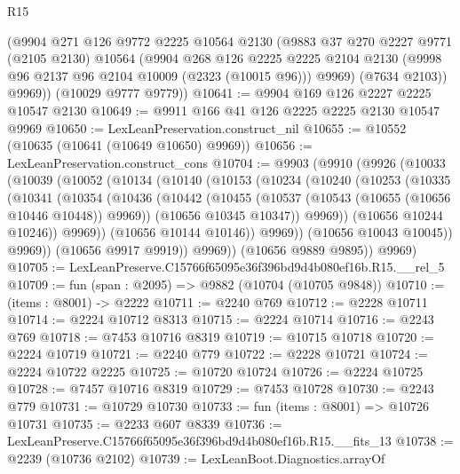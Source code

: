 \begin{lexlean}{R15}
\begin{coremodule}
        (@9904
          @271
          @126
          @9772
          @2225
          @10564
          @2130
          (@9883
            @37
            @270
            @2227
            @9771
            (@2105 @2130)
            @10564
            (@9904
              @268
              @126
              @2225
              @2225
              @2104
              @2130
              (@9998 @96 @2137 @96 @2104 @10009 (@2323 (@10015 @96)))
              @9969)
            (@7634 @2103))
          @9969))
      (@10029 @9777 @9779))
@10641 := @9904 @169 @126 @2227 @2225 @10547 @2130
@10649 := @9911 @166 @41 @126 @2225 @2225 @2130 @10547 @9969
@10650 := LexLeanPreservation.construct_nil
@10655 := @10552 (@10635 (@10641 (@10649 @10650) @9969))
@10656 := LexLeanPreservation.construct_cons
@10704 := @9903
    (@9910
      (@9926
        (@10033
          (@10039
            (@10052
              (@10134
                (@10140
                  (@10153
                    (@10234
                      (@10240
                        (@10253
                          (@10335
                            (@10341
                              (@10354
                                (@10436
                                  (@10442
                                    (@10455
                                      (@10537 (@10543 (@10655 (@10656 @10446 @10448)) @9969))
                                      (@10656 @10345 @10347))
                                    @9969))
                                (@10656 @10244 @10246))
                              @9969))
                          (@10656 @10144 @10146))
                        @9969))
                    (@10656 @10043 @10045))
                  @9969))
              (@10656 @9917 @9919))
            @9969))
        (@10656 @9889 @9895))
      @9969)
@10705 := LexLeanPreserve.C15766f65095e36f396bd9d4b080ef16b.R15.__rel_5
@10709 := fun (span : @2095) => @9882 (@10704 (@10705 @9848))
@10710 := (items : @8001) -> @2222
@10711 := @2240 @769
@10712 := @2228 @10711
@10714 := @2224 @10712 @8313
@10715 := @2224 @10714
@10716 := @2243 @769
@10718 := @7453 @10716 @8319
@10719 := @10715 @10718
@10720 := @2224 @10719
@10721 := @2240 @779
@10722 := @2228 @10721
@10724 := @2224 @10722 @2225
@10725 := @10720 @10724
@10726 := @2224 @10725
@10728 := @7457 @10716 @8319
@10729 := @7453 @10728
@10730 := @2243 @779
@10731 := @10729 @10730
@10733 := fun (items : @8001) => @10726 @10731
@10735 := @2233 @607 @8339
@10736 := LexLeanPreserve.C15766f65095e36f396bd9d4b080ef16b.R15.__fits_13
@10738 := @2239 (@10736 @2102)
@10739 := LexLeanBoot.Diagnostics.arrayOf

\end{coremodule}
\end{lexlean}

